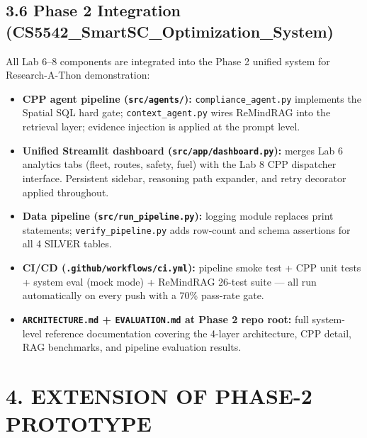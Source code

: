 \documentclass[11pt, letterpaper]{article}
\begin{document}
\subsection*{3.6 Phase 2 Integration (CS5542\_SmartSC\_Optimization\_System)}
All Lab 6--8 components are integrated into the Phase 2 unified system for Research-A-Thon demonstration:
\begin{itemize}[leftmargin=*]
    \item \textbf{CPP agent pipeline (\texttt{src/agents/}):} \texttt{compliance\_agent.py} implements the Spatial SQL hard gate; \texttt{context\_agent.py} wires ReMindRAG into the retrieval layer; evidence injection is applied at the prompt level.
    \item \textbf{Unified Streamlit dashboard (\texttt{src/app/dashboard.py}):} merges Lab 6 analytics tabs (fleet, routes, safety, fuel) with the Lab 8 CPP dispatcher interface. Persistent sidebar, reasoning path expander, and retry decorator applied throughout.
    \item \textbf{Data pipeline (\texttt{src/run\_pipeline.py}):} logging module replaces print statements; \texttt{verify\_pipeline.py} adds row-count and schema assertions for all 4 SILVER tables.
    \item \textbf{CI/CD (\texttt{.github/workflows/ci.yml}):} pipeline smoke test + CPP unit tests + system eval (mock mode) + ReMindRAG 26-test suite — all run automatically on every push with a 70\% pass-rate gate.
    \item \textbf{\texttt{ARCHITECTURE.md} + \texttt{EVALUATION.md} at Phase 2 repo root:} full system-level reference documentation covering the 4-layer architecture, CPP detail, RAG benchmarks, and pipeline evaluation results.
\end{itemize}

\section{4. EXTENSION OF PHASE-2 PROTOTYPE}
\end{document}
